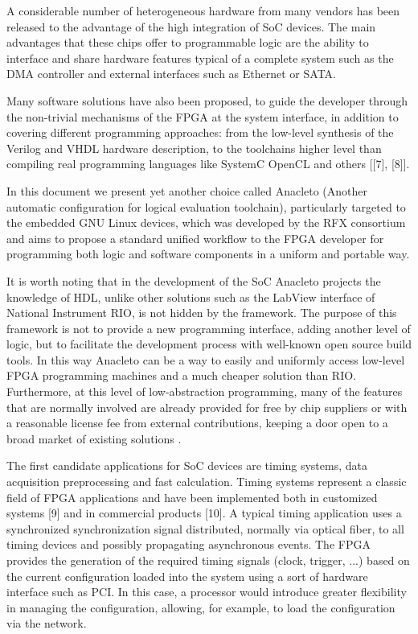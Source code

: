 A considerable number of heterogeneous hardware from many vendors has been released to the advantage of the high integration of SoC devices. The main advantages that these chips offer to programmable logic are the ability to interface and share hardware features typical of a complete system such as the DMA controller and external interfaces such as Ethernet or SATA.

Many software solutions have also been proposed, to guide the developer through the non-trivial mechanisms of the FPGA at the system interface, in addition to covering different programming approaches: from the low-level synthesis of the Verilog and VHDL hardware description, to the toolchains higher level than compiling real programming languages like SystemC OpenCL and others [[7], [8]].

In this document we present yet another choice called Anacleto (Another automatic configuration for logical evaluation toolchain), particularly targeted to the embedded GNU Linux devices, which was developed by the RFX consortium and aims to propose a standard unified workflow to the FPGA developer for programming both logic and software components in a uniform and portable way.

It is worth noting that in the development of the SoC Anacleto projects the knowledge of HDL, unlike other solutions such as the LabView interface of National Instrument RIO, is not hidden by the framework. The purpose of this framework is not to provide a new programming interface, adding another level of logic, but to facilitate the development process with well-known open source build tools. In this way Anacleto can be a way to easily and uniformly access low-level FPGA programming machines and a much cheaper solution than RIO. Furthermore, at this level of low-abstraction programming, many of the features that are normally involved are already provided for free by chip suppliers or with a reasonable license fee from external contributions, keeping a door open to a broad market of existing solutions .

The first candidate applications for SoC devices are timing systems, data acquisition preprocessing and fast calculation. Timing systems represent a classic field of FPGA applications and have been implemented both in customized systems [9] and in commercial products [10]. A typical timing application uses a synchronized synchronization signal distributed, normally via optical fiber, to all timing devices and possibly propagating asynchronous events. The FPGA provides the generation of the required timing signals (clock, trigger, ...) based on the current configuration loaded into the system using a sort of hardware interface such as PCI. In this case, a processor would introduce greater flexibility in managing the configuration, allowing, for example, to load the configuration via the network.

